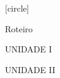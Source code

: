 \documentclass[xcolor=table]{beamer}
\begin{document}
{
[circle]

\begin{frame}[c,t]{Roteiro}
\vspace*{0.5cm}
\hspace*{0.5cm}
   \begin{minipage}{\textwidth}
    
    \begin{multicols}{2}
    UNIDADE I\vspace*{0.5cm}

    \tableofcontents[part=1]
    
    \columnbreak
    UNIDADE II\vspace*{0.5cm}
    
    \tableofcontents[part=2]
    \end{multicols}
    
    

   \end{minipage}
\end{frame}

}
\addtocounter{framenumber}{-1}



















\end{document}
